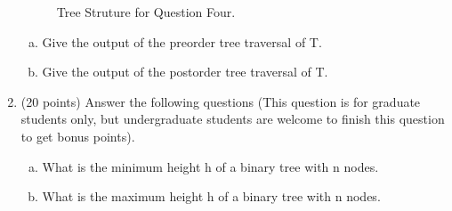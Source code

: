 \documentclass{article}
\begin{document}
\begin{enumerate}
\begin{figure}[H]
  \begin{center}
    \caption{Tree Struture for Question Four.\label{fig:question4}}
    \vspace{-15pt}
  \end{center}
\end{figure}
\begin{enumerate}[(a)]
\item Give the output of the preorder tree traversal of
  T.  
\item Give the output of the postorder tree traversal of
  T.  
\end{enumerate}

\item(20 points) Answer the following questions (This question is for
graduate students only, but undergraduate students are welcome to
finish this question to get bonus points). 
\begin{enumerate}[(a)]
\item What is the minimum height h of a binary tree with n nodes.
\item What is the maximum height h of a binary tree with n nodes.
\end{enumerate}


\end{enumerate}
\end{document}
